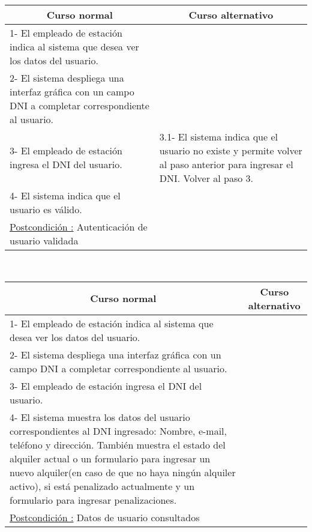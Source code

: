 \begin{center}
    \centering
    \begin{tabular}{ | p{11cm} | p{6cm} | }
    	\multicolumn{1}{c}{\cellcolor{black!30}\textbf{Curso normal}} & 
    	\multicolumn{1}{c}{\cellcolor{black!30}\textbf{Curso alternativo}} \\
		\hline
		1- El empleado de estación indica al sistema que desea ver los datos del usuario. &  \\ \hline
		2- El sistema despliega una interfaz gráfica con un campo DNI a completar correspondiente al usuario. &  \\ \hline
		3- El empleado de estación ingresa el DNI del usuario. &  
		3.1- El sistema indica que el usuario no existe y permite volver al paso anterior para ingresar el DNI. Volver al paso 3. \\ \hline
		4- El sistema indica que el usuario es válido. & \\ \hline
		\underline{Postcondición :} Autenticación de usuario validada & \\ \hline
    \end{tabular}
\end{center}

~

\begin{center}
    \centering
    \begin{tabular}{ | p{11cm} | p{6cm} | }
    	\multicolumn{1}{c}{\cellcolor{black!30}\textbf{Curso normal}} & 
    	\multicolumn{1}{c}{\cellcolor{black!30}\textbf{Curso alternativo}} \\
		\hline
		1- El empleado de estación indica al sistema que desea ver los datos del usuario. &  \\ \hline
		2- El sistema despliega una interfaz gráfica con un campo DNI a completar correspondiente al usuario. &  \\ \hline
		3- El empleado de estación ingresa el DNI del usuario. &  \\ \hline
		4- El sistema muestra los datos del usuario correspondientes al DNI ingresado: Nombre, e-mail, teléfono y dirección. También muestra el estado del alquiler actual o un formulario para ingresar un nuevo alquiler(en caso de que no haya ningún alquiler activo), si está penalizado actualmente y un formulario para ingresar penalizaciones. & \\ \hline		
		\underline{Postcondición :} Datos de usuario consultados & \\ \hline
    \end{tabular}
\end{center}

